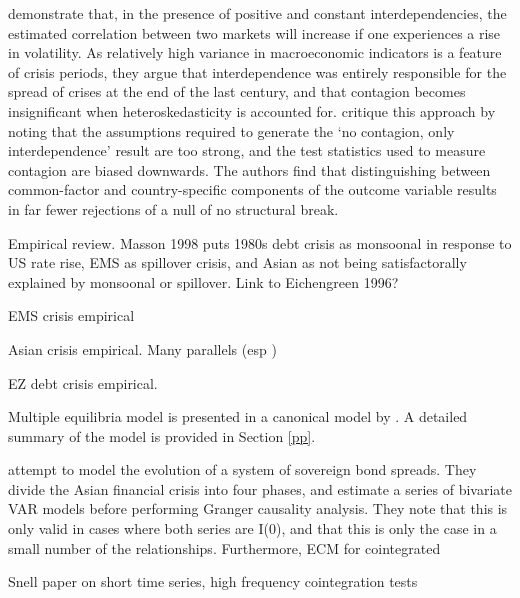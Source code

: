 \documentclass[../base.tex]{subfiles}
\begin{document}
\cite{forbes2002no} demonstrate that, in the presence of positive and constant interdependencies, the estimated correlation between two markets will increase if one experiences a rise in volatility. As relatively high variance in macroeconomic indicators is a feature of crisis periods, they argue that interdependence was entirely responsible for the spread of crises at the end of the last century, and that contagion becomes insignificant when heteroskedasticity is accounted for. \cite{corsetti2005some} critique this approach by noting that the assumptions required to generate the `no contagion, only interdependence' result are too strong, and the test statistics used to measure contagion are biased downwards. The authors find that distinguishing between common-factor and country-specific components of the outcome variable results in far fewer rejections of a null of no structural break. 


Empirical review. Masson 1998 puts 1980s debt crisis as monsoonal in response to US rate rise, EMS as spillover crisis, and Asian as not being satisfactorally explained by monsoonal or spillover. Link to Eichengreen 1996?

EMS crisis empirical

Asian crisis empirical. Many parallels (esp \cite{kaminsky1999twin})

EZ debt crisis empirical. 



Multiple equilibria model is presented in a canonical model by \cite{pesaran2007econometric}. A detailed summary of the model is provided in Section \ref{pp}.

\cite{sander2003contagion} attempt to model the evolution of a system of sovereign bond spreads. They divide the Asian financial crisis into four phases, and estimate a series of bivariate VAR models before performing Granger causality analysis. They note that this is only valid in cases where both series are I(0), and that this is only the case in a small number of the relationships. Furthermore, ECM for cointegrated

Snell paper on short time series, high frequency cointegration tests


\end{document}
